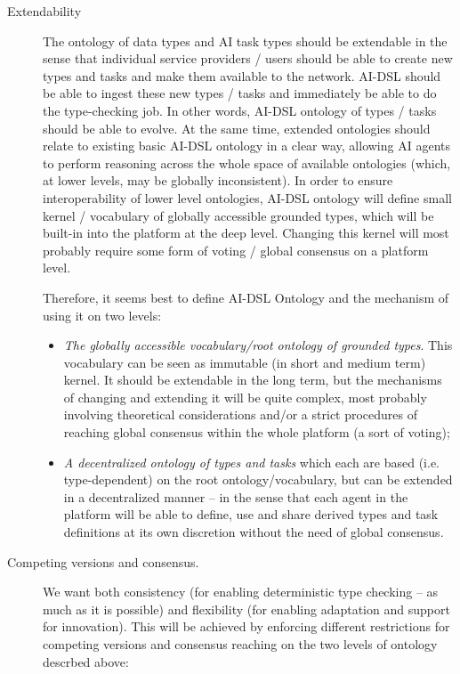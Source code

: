 \documentclass[]{report}
\begin{document}
\begin{description} \item[Extendability] The ontology of data types and AI task
types should be extendable in the sense that individual service providers /
users should be able to create new types and tasks and make them available to
the network. AI-DSL should be able to ingest these new types / tasks and
immediately be able to do the type-checking job. In other words, AI-DSL ontology
of types / tasks should be able to evolve. At the same time, extended ontologies
should relate to existing basic AI-DSL ontology in a clear way, allowing AI
agents to perform reasoning across the whole space of available ontologies
(which, at lower levels, may be globally inconsistent). In order to ensure
interoperability of lower level ontologies, AI-DSL ontology will define small
kernel / vocabulary of globally accessible grounded types, which will be
built-in into the platform at the deep level. Changing this kernel will most
probably require some form of voting / global consensus on a platform level.

  Therefore, it seems best to define AI-DSL Ontology and the mechanism of using
  it on two levels: \begin{itemize} \item \textit{The globally accessible
  vocabulary/root ontology of grounded types}. This vocabulary can be seen as
  immutable (in short and medium term) kernel. It should be extendable in the
  long term, but the mechanisms of changing and extending it will be quite
  complex, most probably involving theoretical considerations and/or a strict
  procedures of reaching global consensus within the whole platform (a sort of
  voting); \item \textit{A decentralized ontology of types and tasks} which each
  are based (i.e. type-dependent) on the root ontology/vocabulary, but can be
  extended in a decentralized manner -- in the sense that each agent in the
  platform will be able to define, use and share derived types and task
  definitions at its own discretion without the need of global consensus.
  \end{itemize}

  \item[Competing versions and consensus.] We want both consistency (for
  enabling deterministic type checking -- as much as it is possible) and
  flexibility (for enabling adaptation and support for innovation). This will be
  achieved by enforcing different restrictions for competing versions and
  consensus reaching on the two levels of ontology descrbed above:


\end{description}
\end{document}
